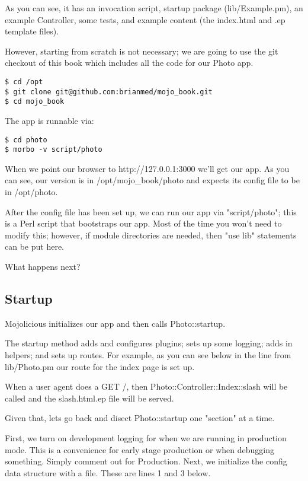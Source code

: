 \documentclass[14pt]{extreport}
\newcommand\Small{\fontsize{12}{13.0}\fontencoding{T1}\selectfont}
\newcommand*\LSTfont{\Small\ttfamily\SetTracking{encoding=*}{-60}\lsstyle}
\begin{document}
As you can see, it has an invocation script, startup package (lib/Example.pm),
an example Controller, some tests, and example content (the index.html and .ep
template files).

However, starting from scratch is not necessary; we are going to use the git
checkout of this book which includes all the code for our Photo app.

\begin{lstlisting}[style=BashOutputStyle]
$ cd /opt
$ git clone git@github.com:brianmed/mojo_book.git
$ cd mojo_book
\end{lstlisting}

The app is runnable via:

\begin{lstlisting}[style=BashInputStyle]
$ cd photo
$ morbo -v script/photo
\end{lstlisting}

When we point our browser to http://127.0.0.1:3000 we'll get our app.  As you
can see, our version is in /opt/mojo\_book/photo and expects its config file to
be in /opt/photo.

After the config file has been set up, we can run our app via "script/photo";
this is a Perl script that bootstraps our app.  Most of the time you won't need
to modify this; however, if module directories are needed, then "use lib" statements
can be put here.

What happens next?

\subsection{Startup}

Mojolicious initializes our app and then calls Photo::startup.

The startup method adds and configures plugins; sets up some logging; adds in
helpers; and sets up routes.  For example, as you can see below in the line
from lib/Photo.pm our route for the index page is set up.



When a user agent does a GET /, then Photo::Controller::Index::slash will be
called and the slash.html.ep file will be served.

Given that, lets go back and disect Photo::startup one "section" at a time.

First, we turn on development logging for when we are running in production
mode.  This is a convenience for early stage production or when debugging
something.  Simply comment out for Production.  Next, we initialize the
config data structure with a file.  These are lines 1 and 3 below.
\end{document}
